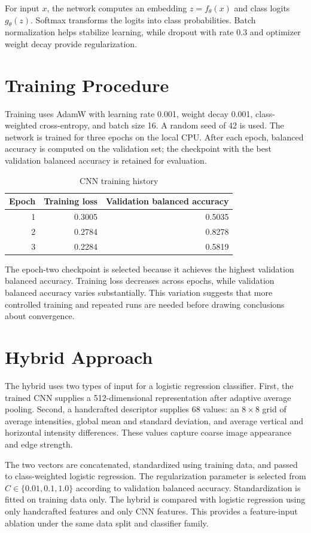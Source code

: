 \documentclass[conference]{IEEEtran}
\begin{document}
For input $x$, the network computes an embedding $z=f_{\theta}(x)$ and class logits $g_{\theta}(z)$. Softmax transforms the logits into class probabilities. Batch normalization helps stabilize learning, while dropout with rate 0.3 and optimizer weight decay provide regularization.

\section{Training Procedure}
Training uses AdamW with learning rate 0.001, weight decay 0.001, class-weighted cross-entropy, and batch size 16. A random seed of 42 is used. The network is trained for three epochs on the local CPU. After each epoch, balanced accuracy is computed on the validation set; the checkpoint with the best validation balanced accuracy is retained for evaluation.

\begin{table}[ht]
\caption{CNN training history}
\label{tab:history}
\centering
\begin{tabular}{rrr}
\toprule
Epoch & Training loss & Validation balanced accuracy \\
\midrule
1 & 0.3005 & 0.5035 \\
2 & 0.2784 & 0.8278 \\
3 & 0.2284 & 0.5819 \\
\bottomrule
\end{tabular}
\end{table}

The epoch-two checkpoint is selected because it achieves the highest validation balanced accuracy. Training loss decreases across epochs, while validation balanced accuracy varies substantially. This variation suggests that more controlled training and repeated runs are needed before drawing conclusions about convergence.

\section{Hybrid Approach}
The hybrid uses two types of input for a logistic regression classifier. First, the trained CNN supplies a 512-dimensional representation after adaptive average pooling. Second, a handcrafted descriptor supplies 68 values: an $8\times8$ grid of average intensities, global mean and standard deviation, and average vertical and horizontal intensity differences. These values capture coarse image appearance and edge strength.

The two vectors are concatenated, standardized using training data, and passed to class-weighted logistic regression. The regularization parameter is selected from $C\in\{0.01,0.1,1.0\}$ according to validation balanced accuracy. Standardization is fitted on training data only. The hybrid is compared with logistic regression using only handcrafted features and only CNN features. This provides a feature-input ablation under the same data split and classifier family.
\end{document}
